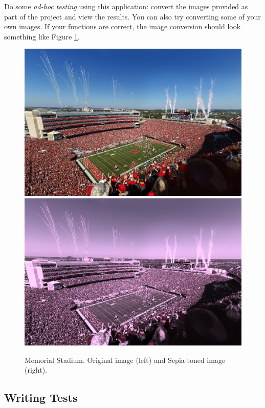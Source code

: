 \documentclass[12pt]{scrartcl}
\begin{document}
Do some \emph{ad-hoc testing} using this application: convert the
images provided as part of the project and view the results.  You 
can also try converting some of your own images.  If your functions
are correct, the image conversion should look something like 
Figure \ref{fig:imageComparisons}.

\begin{figure}[h]
\centering
\includegraphics[scale=0.20]{../images/memorialStadium}
\includegraphics[scale=0.20]{../images/memorialStadiumSepia}
\caption{Memorial Stadium.  Original image (left) and Sepia-toned image (right).}
\label{fig:imageComparisons}
\end{figure}

\subsection{Writing Tests}
\end{document}
